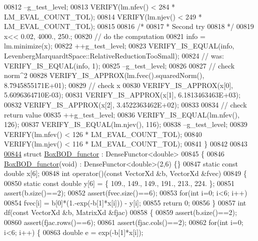 \begin{DoxyCode}
00812   --g\_test\_level;
00813   VERIFY(lm.nfev() < 284 * LM\_EVAL\_COUNT\_TOL);
00814   VERIFY(lm.njev() < 249 * LM\_EVAL\_COUNT\_TOL);
00815 
00816   \textcolor{comment}{/*}
00817 \textcolor{comment}{   * Second try}
00818 \textcolor{comment}{   */}
00819   x<< 0.02, 4000., 250.;
00820   \textcolor{comment}{// do the computation}
00821   info = lm.minimize(x);
00822   ++g\_test\_level;
00823   VERIFY\_IS\_EQUAL(info, LevenbergMarquardtSpace::RelativeReductionTooSmall);
00824   \textcolor{comment}{// was: VERIFY\_IS\_EQUAL(info, 1);}
00825   --g\_test\_level;
00826 
00827   \textcolor{comment}{// check norm^2}
00828   VERIFY\_IS\_APPROX(lm.fvec().squaredNorm(), 8.7945855171E+01);
00829   \textcolor{comment}{// check x}
00830   VERIFY\_IS\_APPROX(x[0], 5.6096364710E-03);
00831   VERIFY\_IS\_APPROX(x[1], 6.1813463463E+03);
00832   VERIFY\_IS\_APPROX(x[2], 3.4522363462E+02);
00833   
00834   \textcolor{comment}{// check return value}
00835   ++g\_test\_level;
00836   VERIFY\_IS\_EQUAL(lm.nfev(), 126);
00837   VERIFY\_IS\_EQUAL(lm.njev(), 116);
00838   --g\_test\_level;
00839   VERIFY(lm.nfev() < 126 * LM\_EVAL\_COUNT\_TOL);
00840   VERIFY(lm.njev() < 116 * LM\_EVAL\_COUNT\_TOL);
00841 \}
00842 
00843 
\hyperlink{struct_box_b_o_d__functor}{00844} \textcolor{keyword}{struct }\hyperlink{struct_box_b_o_d__functor}{BoxBOD\_functor} : DenseFunctor<double>
00845 \{
00846     \hyperlink{struct_box_b_o_d__functor}{BoxBOD\_functor}(\textcolor{keywordtype}{void}) : DenseFunctor<double>(2,6) \{\}
00847     \textcolor{keyword}{static} \textcolor{keyword}{const} \textcolor{keywordtype}{double} x[6];
00848     \textcolor{keywordtype}{int} operator()(\textcolor{keyword}{const} VectorXd &b, VectorXd &fvec)
00849     \{
00850         \textcolor{keyword}{static} \textcolor{keyword}{const} \textcolor{keywordtype}{double} y[6] = \{ 109., 149., 149., 191., 213., 224. \};
00851         assert(b.size()==2);
00852         assert(fvec.size()==6);
00853         \textcolor{keywordflow}{for}(\textcolor{keywordtype}{int} i=0; i<6; i++)
00854             fvec[i] =  b[0]*(1.-exp(-b[1]*x[i])) - y[i];
00855         \textcolor{keywordflow}{return} 0;
00856     \}
00857     \textcolor{keywordtype}{int} df(\textcolor{keyword}{const} VectorXd &b, MatrixXd &fjac)
00858     \{
00859         assert(b.size()==2);
00860         assert(fjac.rows()==6);
00861         assert(fjac.cols()==2);
00862         \textcolor{keywordflow}{for}(\textcolor{keywordtype}{int} i=0; i<6; i++) \{
00863             \textcolor{keywordtype}{double} e = exp(-b[1]*x[i]);

\end{DoxyCode}
